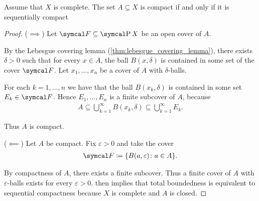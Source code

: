 \begin{theorem}\label{thm:metric_compact_iff_sequentially_compact}
  Assume that \( X \) is complete. The set \( A \subseteq X \) is compact if and only if it is sequentially compact
\end{theorem}
\begin{proof}
  (\( \implies \)) Let \( \Cal{F} \subseteq \Power X \) be an open cover of \( A \).

  By the Lebesgue covering lemma (\cref{thm:lebesgue_covering_lemma}), there exists \( \delta > 0 \) such that for every \( x \in A \), the ball \( B(x, \delta) \) is contained in some set of the cover \( \Cal{F} \). Let \( x_1, \ldots, x_n \) be a cover of \( A \) with \( \delta \)-balls.

  For each \( k = 1, \ldots, n \) we have that the ball \( B(x_k, \delta) \) is contained in some set \( E_k \in \Cal{F} \). Hence \( E_1, \ldots, E_n \) is a finite subcover of \( A \), because
  \begin{align*}
    A \subseteq \bigcup_{k=1}^\infty B(x_k, \delta) \subseteq \bigcup_{k=1}^\infty E_k.
  \end{align*}

  Thus \( A \) is compact.

  (\( \impliedby \)) Let \( A \) be compact. Fix \( \varepsilon > 0 \) and take the cover
  \begin{align*}
    \Cal{F} \coloneqq \{ B(a, \varepsilon) \colon a \in A \}.
  \end{align*}

  By compactness of \( A \), there exists a finite subcover. Thus a finite cover of \( A \) with \( \varepsilon \)-balls exists for every \( \varepsilon > 0 \).  then implies that total boundedness is equivalent to sequential compactness because \( X \) is complete and \( A \) is closed.
\end{proof}

